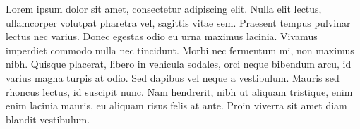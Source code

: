 Lorem ipsum dolor sit amet, consectetur adipiscing elit. Nulla elit lectus, ullamcorper volutpat pharetra vel, sagittis vitae sem. Praesent tempus pulvinar lectus nec varius. Donec egestas odio eu urna maximus lacinia. Vivamus imperdiet commodo nulla nec tincidunt. Morbi nec fermentum mi, non maximus nibh. Quisque placerat, libero in vehicula sodales, orci neque bibendum arcu, id varius magna turpis at odio. Sed dapibus vel neque a vestibulum. Mauris sed rhoncus lectus, id suscipit nunc. Nam hendrerit, nibh ut aliquam tristique, enim enim lacinia mauris, eu aliquam risus felis at ante. Proin viverra sit amet diam blandit vestibulum.